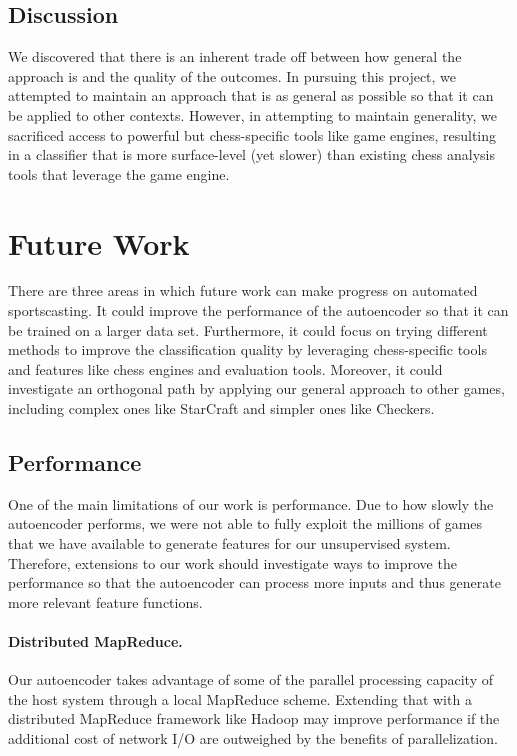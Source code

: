 \documentclass[11pt]{article}
\begin{document}
\subsection{Discussion}
We discovered that there is an inherent trade off between how general the approach is and the quality of the outcomes. In pursuing this project, we attempted to maintain an approach that is as general as possible so that it can be applied to other contexts. However, in attempting to maintain generality, we sacrificed access to powerful but chess-specific tools like game engines, resulting in a classifier that is more surface-level (yet slower) than existing chess analysis tools that leverage the game engine. 

\section{Future Work}
There are three areas in which future work can make progress on automated sportscasting. It could improve the performance of the autoencoder so that it can be trained on a larger data set. Furthermore, it could focus on trying different methods to improve the classification quality by leveraging chess-specific tools and features like chess engines and evaluation tools. Moreover, it could investigate an orthogonal path by applying our general approach to other games, including complex ones like StarCraft and simpler ones like Checkers.

\subsection{Performance}
One of the main limitations of our work is performance. Due to how slowly the autoencoder performs, we were not able to fully exploit the millions of games that we have available to generate features for our unsupervised system. Therefore, extensions to our work should investigate ways to improve the performance so that the autoencoder can process more inputs and thus generate more relevant feature functions.

\paragraph{Distributed MapReduce.}
Our autoencoder takes advantage of some of the parallel processing capacity of the host system through a local MapReduce scheme. Extending that with a distributed MapReduce framework like Hadoop may improve performance if the additional cost of network I/O are outweighed by the benefits of parallelization.
\end{document}
